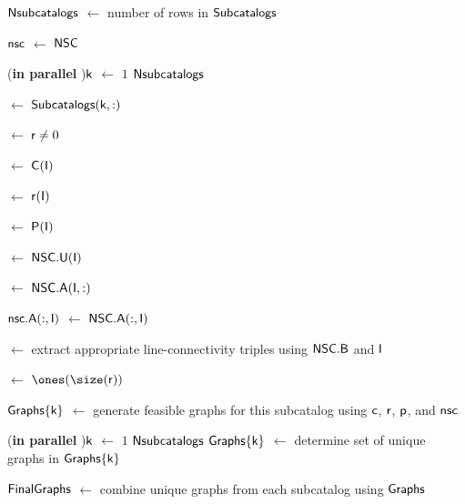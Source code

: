 \begin{vAlgorithm}[!ht]{\columnwidth}{0em}
$\textup{\textsf{Nsubcatalogs}}$ $\leftarrow$ number of rows in $\textup{\textsf{Subcatalogs}}$ 

$\textup{\textsf{nsc}}$ $\leftarrow$ $\textup{\textsf{NSC}}$ 

\For(\textbf{in parallel} \label{alg:app1:subcatalogs-l7}){$\textup{\textsf{k}}$ $\leftarrow$ $1$ \KwTo $\textup{\textsf{Nsubcatalogs}}$}{

     $\leftarrow$ $\textup{\textsf{Subcatalogs}}(\textup{\textsf{k}},:)$ 


    
     $\leftarrow$ $\textup{\textsf{r}} \neq 0$ 

     $\leftarrow$ $\textup{\textsf{C}}(\textup{\textsf{I}})$  

     $\leftarrow$ $\textup{\textsf{r}}(\textup{\textsf{I}})$  

     $\leftarrow$ $\textup{\textsf{P}}(\textup{\textsf{I}})$ 

     $\leftarrow$ $\textup{\textsf{NSC}}.\textup{\textsf{U}}(\textup{\textsf{I}})$ 

     $\leftarrow$ $\textup{\textsf{NSC}}.\textup{\textsf{A}}(\textup{\textsf{I}},:)$ 

    $\textup{\textsf{nsc}}.\textup{\textsf{A}}(:,\textup{\textsf{I}})$ $\leftarrow$ $\textup{\textsf{NSC}}.\textup{\textsf{A}}(:,\textup{\textsf{I}})$ 

     $\leftarrow$ extract appropriate line-connectivity triples using $\textup{\textsf{NSC}}.\textup{\textsf{B}}$ and $\textup{\textsf{I}}$ 

     $\leftarrow$ $\ones(\size(\xvar{r}))$ 

    $\textup{\textsf{Graphs}}\{\textup{\textsf{k}}\}$ $\leftarrow$ generate feasible graphs for this subcatalog using $\textup{\textsf{c}}$, $\textup{\textsf{r}}$, $\textup{\textsf{p}}$, and $\textup{\textsf{nsc}}$


}

\For(\textbf{in parallel} ){$\textup{\textsf{k}}$ $\leftarrow$ $1$ \KwTo $\textup{\textsf{Nsubcatalogs}}$}{
    $\textup{\textsf{Graphs}}\{\textup{\textsf{k}}\}$ $\leftarrow$ determine set of unique graphs in $\textup{\textsf{Graphs}}\{\textup{\textsf{k}}\}$
}

$\textup{\textsf{FinalGraphs}}$ $\leftarrow$ combine unique graphs from each subcatalog using $\textup{\textsf{Graphs}}$

\end{vAlgorithm}